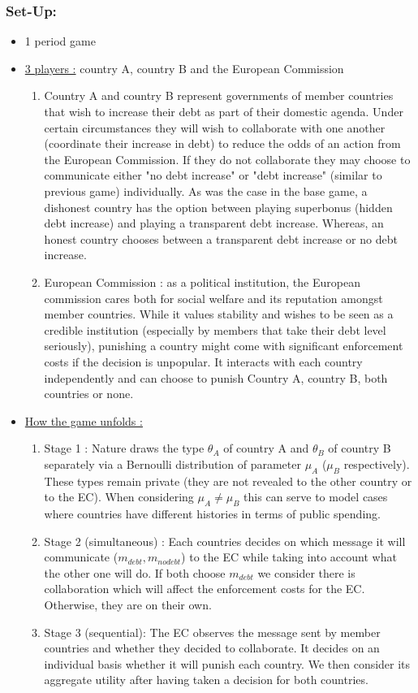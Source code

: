 \documentclass{article}
\begin{document}
\subsubsection{Set-Up:}
\begin{itemize}
    \item 1 period game
    \item \underline{3 players :} country A, country B and the European Commission 
    \begin{enumerate}
        \item Country A and country B represent governments of member countries that wish to increase their debt as part of their domestic agenda. Under certain circumstances they will wish to collaborate with one another (coordinate their increase in debt) to reduce the odds of an action from the European Commission. If they do not collaborate they may choose to communicate either "no debt increase" or "debt increase" (similar to previous game) individually.
        As was the case in the base game, a dishonest country has the option between playing superbonus (hidden debt increase) and playing a transparent debt increase. Whereas, an honest country chooses between a transparent debt increase or no debt increase.
        \item European Commission : as a political institution, the European commission cares both for social welfare and its reputation amongst member countries. While it values stability and wishes to be seen as a credible institution (especially by members that take their debt level seriously), punishing a country might come with significant enforcement costs if the decision is unpopular. It interacts with each country independently and can choose to punish Country A, country B, both countries or none. 
    \end{enumerate}
    \item \underline{How the game unfolds : }
    \begin{enumerate}
        \item Stage 1 : Nature draws the type $\theta_A$ of country A and $\theta_B$ of country B separately via a Bernoulli distribution of parameter $\mu_A$ ($\mu_B$ respectively). These types remain private (they are not revealed to the other country or to the EC). When considering $\mu_A\neq \mu_B$ this can serve to model cases where countries have different histories in terms of public spending. 
        \item Stage 2 (simultaneous) : Each countries decides on which message it will communicate ($m_{debt},m_{nodebt}$) to the EC while taking into account what the other one will do. If both choose $m_{debt}$ we consider there is collaboration which will affect the enforcement costs for the EC. Otherwise, they are on their own. 
        \item Stage 3 (sequential): The EC observes the message sent by member countries and whether they decided to collaborate. It decides on an individual basis whether it will punish each country. We then consider its aggregate utility after having taken a decision for both countries. 
    \end{enumerate}
\end{itemize}
\end{document}
